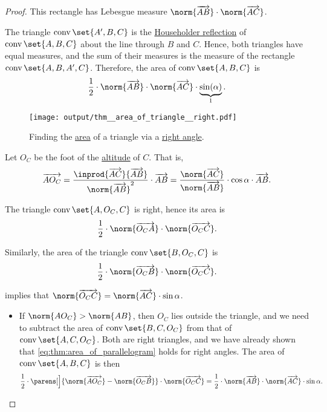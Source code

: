 \begin{proof}
  This rectangle has Lebesgue measure \( \norm{\vect{AB}} \cdot \norm{\vect{AC}} \).

  The triangle \( \conv\set{ A', B, C } \) is the \hyperref[def:rigid_motion/householder_reflection]{Householder reflection} of \( \conv\set{ A, B, C } \) about the line through \( B \) and \( C \). Hence, both triangles have equal measures, and the sum of their measures is the measure of the rectangle \( \conv\set{ A, B, A', C } \). Therefore, the area of \( \conv\set{ A, B, C } \) is
  \begin{equation*}
    \frac 1 2 \cdot \norm{\vect{AB}} \cdot \norm{\vect{AC}} \cdot \underbrace{ \sin(\alpha) }_{1}.
  \end{equation*}

  \begin{figure}[!ht]
    \centering
    \texttt{[image: output/thm\_\_area\_of\_triangle\_\_right.pdf]}
    \caption{Finding the \hyperref[def:figure_area]{area} of a triangle via a \hyperref[def:angle/measure/right]{right angle}.}\label{fig:thm:area_of_triangle/right}
  \end{figure}

   Let \( O_C \) be the foot of the \hyperref[def:triangle_altitude]{altitude} of \( C \). That is,
  \begin{equation*}
    \vect{A O_C}
    =
    \frac {\inprod {\vect{AC}} {\vect{AB}}} {\norm{\vect{AB}}^2} \cdot \vect{AB}
    =
    \frac {\norm{\vect{AC}}} {\norm{\vect{AB}}} \cdot \cos \alpha \cdot \vect{AB}.
  \end{equation*}

  The triangle \( \conv\set{ A, O_C, C } \) is right, hence its area is
  \begin{equation*}
    \frac 1 2 \cdot \norm{\vect{ O_CA}} \cdot \norm{\vect{O_C C}}.
  \end{equation*}

  Similarly, the area of the triangle \( \conv\set{ B, O_C, C } \) is
  \begin{equation*}
    \frac 1 2 \cdot \norm{\vect{O_C B}} \cdot \norm{\vect{O_C C}}.
  \end{equation*}

   implies that \( \norm{\vect{O_C C}} = \norm{\vect{AC}} \cdot \sin \alpha \).

  \begin{itemize}
    \item If \( \norm{A O_C} > \norm{A B} \), then \( O_C \) lies outside the triangle, and we need to subtract the area of \( \conv\set{ B, C, O_C } \) from that of \( \conv\set{ A, C, O_C } \). Both are right triangles, and we have already shown that \eqref{eq:thm:area_of_parallelogram} holds for right angles. The area of \( \conv\set{ A, B, C } \) is then
    \begin{equation*}
      \frac 1 2 \cdot \parens[\Big]{ \norm{\vect{A O_C}} - \norm{\vect{O_C B}} } \cdot \norm{\vect{O_C C}} = \frac 1 2 \cdot \norm{\vect{AB}} \cdot \norm{\vect{AC}} \cdot \sin \alpha.
    \end{equation*}


\end{itemize}
\end{proof}
